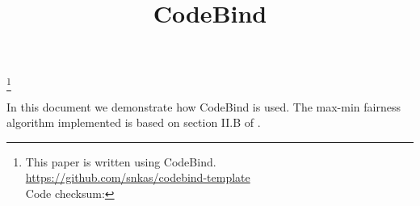 \documentclass[a4paper,11pt]{article}
\author{}
\title{CodeBind}
\date{}
\newcommand\markerlessfootnote[1]{%
	\begingroup%
	\renewcommand\thefootnote{}\footnote{#1}%
	\addtocounter{footnote}{-1}%
	\endgroup%
}
\begin{document}
\maketitle

\noindent\markerlessfootnote{%
\hspace{-0.58cm}This paper is written using CodeBind.\\%
\url{https://github.com/snkas/codebind-template}\\%
Code checksum: \expcodechecksum{}%
}%
In this document we demonstrate how CodeBind is used. The max-min fairness algorithm implemented is based on section II.B of \cite{nace2006}.





\end{document}
